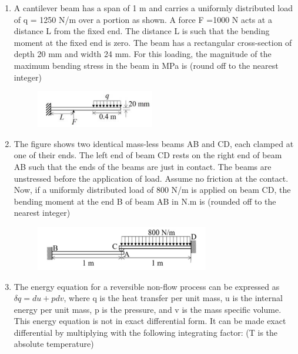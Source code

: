 \documentclass[a4paper,10pt]{article}
\begin{document}
\begin{enumerate}
\hfill{}

\item A cantilever beam has a span of 1 m and carries a uniformly distributed load of q = 1250 N/m over a portion as shown. A force F =1000 N acts at a distance L from the fixed end. The distance L is such that the bending moment at the fixed end is zero. The beam has a rectangular cross-section of depth 20 mm and width 24 mm. For this loading, the magnitude of the maximum bending stress in the beam in MPa is \underline{\hspace{2cm}} (round off to the nearest integer)
\begin{figure}[H]
    \centering
    \includegraphics[width=0.5\columnwidth]{q86.png}
    \caption*{}
    \label{fig:q86}
\end{figure}

\hfill{}

\item The figure shows two identical mass-less beams AB and CD, each clamped at one of their ends. The left end of beam CD rests on the right end of beam AB such that the ends of the beams are just in contact. The beams are unstressed before the application of load. Assume no friction at the contact. Now, if a uniformly distributed load of 800 N/m is applied on beam CD, the bending moment at the end B of beam AB in N.m is \underline{\hspace{2cm}} (rounded off to the nearest integer)
\begin{figure}[H]
    \centering
    \includegraphics[width=0.6\columnwidth]{q87.png}
    \caption*{}
    \label{fig:q87}
\end{figure}

\hfill{}

\item The energy equation for a reversible non-flow process can be expressed as $\delta q = du + p dv$, where q is the heat transfer per unit mass, u is the internal energy per unit mass, p is the pressure, and v is the mass specific volume. This energy equation is not in exact differential form. It can be made exact differential by multiplying with the following integrating factor: (T is the absolute temperature)


\end{enumerate}
\end{document}
